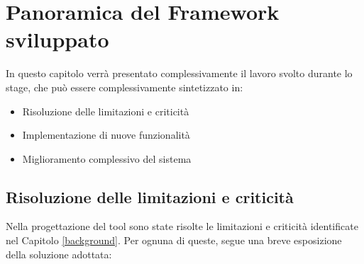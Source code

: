 \chapter{Panoramica del Framework sviluppato}
In questo capitolo verrà presentato complessivamente il lavoro svolto durante lo stage, che può essere complessivamente sintetizzato in:
\begin{itemize} [nosep]
\item Risoluzione delle limitazioni e criticità
\item Implementazione di nuove funzionalità
\item Miglioramento complessivo del sistema
\end{itemize}

\section{Risoluzione delle limitazioni e criticità}
Nella progettazione del tool sono state risolte le limitazioni e criticità identificate nel Capitolo \ref{background}. Per ognuna di queste, segue una breve esposizione della soluzione adottata:

